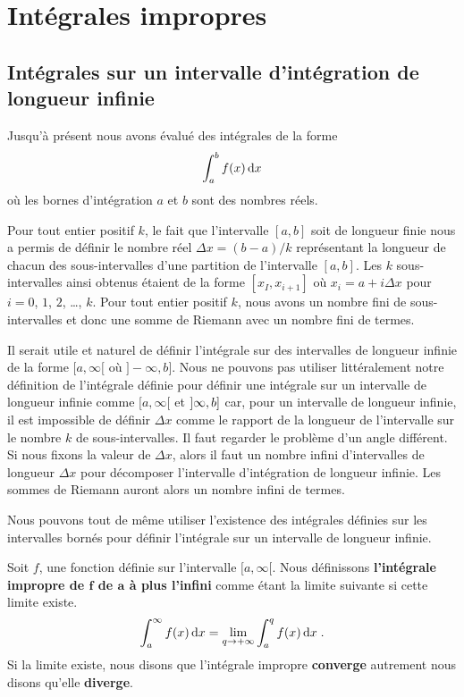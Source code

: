 {

\section{Intégrales impropres}

\subsection{Intégrales sur un intervalle d'intégration de longueur
infinie}

Jusqu'à présent nous avons évalué des intégrales de la forme
\[
\int_a^b f(x) \,\mathrm{d}x
\]
où les bornes d'intégration $a$ et $b$ sont des nombres réels.

Pour tout entier positif $k$, le fait que l'intervalle $[a,b]$ soit de
longueur finie nous a permis de définir le nombre réel
$\Delta x = (b-a)/k$ représentant la longueur de chacun des
sous-intervalles d'une partition de l'intervalle $[a,b]$.  Les $k$
sous-intervalles ainsi obtenus étaient de la forme $[x_I, x_{i+1}]$ où
$x_i = a +i \Delta x$ pour $i=0$, $1$, $2$, \ldots, $k$.  Pour tout
entier positif $k$, nous avons un nombre fini de sous-intervalles et donc
une somme de Riemann avec un nombre fini de termes.

Il serait utile et naturel de définir l'intégrale sur des intervalles
de longueur infinie de la forme $[a,\infty[$ où $]-\infty, b]$.  Nous ne
pouvons pas utiliser littéralement notre définition de l'intégrale
définie pour définir une intégrale sur un intervalle de longueur
infinie comme $[a,\infty[$ et $]\-\infty, b]$ car, pour un intervalle
de longueur infinie, il est impossible de définir $\Delta x$ comme le
rapport de la longueur de l'intervalle sur le nombre $k$ de
sous-intervalles.  Il faut regarder le problème d'un angle
différent. Si nous fixons la valeur de $\Delta x$, alors il faut un nombre
infini d'intervalles de longueur $\Delta x$ pour décomposer
l'intervalle d'intégration de longueur infinie.  Les sommes de Riemann
auront alors un nombre infini de termes.

Nous pouvons tout de même utiliser l'existence des intégrales définies sur
les intervalles bornés pour définir l'intégrale sur un intervalle de
longueur infinie.

\begin{defn}
Soit $f$, une fonction définie sur l'intervalle $[a,\infty[$. Nous
définissons {\bfseries l'intégrale impropre de $\mathbf f$ de $\mathbf a$
à plus l'infini} comme étant la limite suivante si cette limite
existe.
\[
\int_a^\infty f(x) \,\mathrm{d}x = \lim_{q\rightarrow +\infty} \int_a^q f(x)\,\mathrm{d}x \; .
\]
Si la limite existe, nous disons que l'intégrale impropre
{\bfseries converge} autrement nous disons qu'elle {\bfseries diverge}.


\end{defn}}
